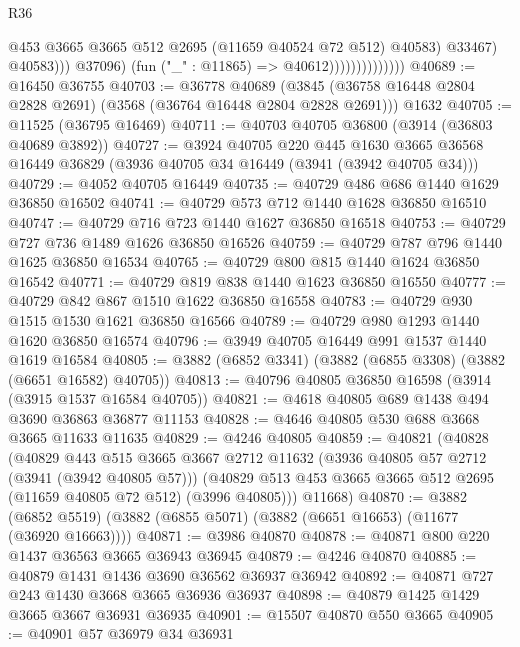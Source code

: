 \begin{lexlean}{R36}
\begin{coremodule}
                                          @453
                                          @3665
                                          @3665
                                          @512
                                          @2695
                                          (@11659 @40524 @72 @512)
                                          @40583)
                                        @33467)
                                      @40583)))
                                @37096)
                              (fun ("_" : @11865) => @40612))))))))))))))
@40689 := @16450 @36755
@40703 := @36778
    @40689
    (@3845 (@36758 @16448 @2804 @2828 @2691) (@3568 (@36764 @16448 @2804 @2828 @2691)))
    @1632
@40705 := @11525 (@36795 @16469)
@40711 := @40703 @40705 @36800 (@3914 (@36803 @40689 @3892))
@40727 := @3924
    @40705
    @220
    @445
    @1630
    @3665
    @36568
    @16449
    @36829
    (@3936 @40705 @34 @16449 (@3941 (@3942 @40705 @34)))
@40729 := @4052 @40705 @16449
@40735 := @40729 @486 @686 @1440 @1629 @36850 @16502
@40741 := @40729 @573 @712 @1440 @1628 @36850 @16510
@40747 := @40729 @716 @723 @1440 @1627 @36850 @16518
@40753 := @40729 @727 @736 @1489 @1626 @36850 @16526
@40759 := @40729 @787 @796 @1440 @1625 @36850 @16534
@40765 := @40729 @800 @815 @1440 @1624 @36850 @16542
@40771 := @40729 @819 @838 @1440 @1623 @36850 @16550
@40777 := @40729 @842 @867 @1510 @1622 @36850 @16558
@40783 := @40729 @930 @1515 @1530 @1621 @36850 @16566
@40789 := @40729 @980 @1293 @1440 @1620 @36850 @16574
@40796 := @3949 @40705 @16449 @991 @1537 @1440 @1619 @16584
@40805 := @3882 (@6852 @3341) (@3882 (@6855 @3308) (@3882 (@6651 @16582) @40705))
@40813 := @40796 @40805 @36850 @16598 (@3914 (@3915 @1537 @16584 @40705))
@40821 := @4618 @40805 @689 @1438 @494 @3690 @36863 @36877 @11153
@40828 := @4646 @40805 @530 @688 @3668 @3665 @11633 @11635
@40829 := @4246 @40805
@40859 := @40821
    (@40828
      (@40829
        @443
        @515
        @3665
        @3667
        @2712
        @11632
        (@3936 @40805 @57 @2712 (@3941 (@3942 @40805 @57)))
        (@40829 @513 @453 @3665 @3665 @512 @2695 (@11659 @40805 @72 @512) (@3996 @40805)))
      @11668)
@40870 := @3882 (@6852 @5519) (@3882 (@6855 @5071) (@3882 (@6651 @16653) (@11677 (@36920 @16663))))
@40871 := @3986 @40870
@40878 := @40871 @800 @220 @1437 @36563 @3665 @36943 @36945
@40879 := @4246 @40870
@40885 := @40879 @1431 @1436 @3690 @36562 @36937 @36942
@40892 := @40871 @727 @243 @1430 @3668 @3665 @36936 @36937
@40898 := @40879 @1425 @1429 @3665 @3667 @36931 @36935
@40901 := @15507 @40870 @550 @3665
@40905 := @40901 @57 @36979 @34 @36931

\end{coremodule}
\end{lexlean}
